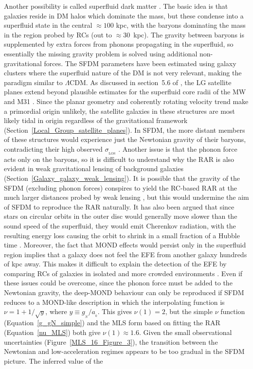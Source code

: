 \documentclass[fleqn,usenatbib,useAMS]{mnras} %
\begin{document}
Another possibility is called superfluid dark matter \citep[SFDM;][]{Berezhiani_2015, Berezhiani_2016}. The basic idea is that galaxies reside in DM halos which dominate the mass, but these condense into a superfluid state in the central $\approx 100$ kpc, with the baryons dominating the mass in the region probed by RCs (out to $\approx 30$~kpc). The gravity between baryons is supplemented by extra forces from phonons propagating in the superfluid, so essentially the missing gravity problem is solved using additional non-gravitational forces. The SFDM parameters have been estimated using galaxy clusters \citep{Hodson_2017_SFDM_clusters} where the superfluid nature of the DM is not very relevant, making the paradigm similar to $\Lambda$CDM. As discussed in section~5.6 of \citet{Roshan_2021_disc_stability}, the LG satellite planes extend beyond plausible estimates for the superfluid core radii of the MW and M31 \citep{Berezhiani_2016, Hossenfelder_2020}. Since the planar geometry and coherently rotating velocity trend make a primordial origin unlikely, the satellite galaxies in these structures are most likely tidal in origin regardless of the gravitational framework (Section~\ref{Local_Group_satellite_planes}). In SFDM, the more distant members of these structures would experience just the Newtonian gravity of their baryons, contradicting their high observed $\sigma_{_\text{LOS}}$ \citep{McGaugh_Wolf_2010, McGaugh_2013a, McGaugh_2013b}. Another issue is that the phonon force acts only on the baryons, so it is difficult to understand why the RAR is also evident in weak gravitational lensing of background galaxies (Section~\ref{Galaxy_galaxy_weak_lensing}). It is possible that the gravity of the SFDM (excluding phonon forces) conspires to yield the RC-based RAR at the much larger distances probed by weak lensing \citep{Brimioulle_2013, Milgrom_2013, Brouwer_2017, Brouwer_2021}, but this would undermine the aim of SFDM to reproduce the RAR naturally. It has also been argued that since stars on circular orbits in the outer disc would generally move slower than the sound speed of the superfluid, they would emit Cherenkov radiation, with the resulting energy loss causing the orbit to shrink in a small fraction of a Hubble time \citep{Mistele_2021}. Moreover, the fact that MOND effects would persist only in the superfluid region implies that a galaxy does not feel the EFE from another galaxy hundreds of kpc away. This makes it difficult to explain the detection of the EFE by comparing RCs of galaxies in isolated and more crowded environments \citep{Chae_2020_EFE, Chae_2021}. Even if these issues could be overcome, since the phonon force must be added to the Newtonian gravity, the deep-MOND behaviour can only be reproduced if SFDM reduces to a MOND-like description in which the interpolating function is $\nu = 1 + 1/\sqrt{y}$, where $y \equiv g_{_N}/a_{_0}$. This gives $\nu \left( 1 \right) = 2$, but the simple $\nu$ function (Equation~\ref{g_gN_simple}) and the MLS form based on fitting the RAR (Equation~\ref{nu_MLS}) both give $\nu \left( 1 \right) \approx 1.6$. Given the small observational uncertainties (Figure~\ref{MLS_16_Figure_3}), the transition between the Newtonian and low-acceleration regimes appears to be too gradual in the SFDM picture. The inferred value of the 
\end{document}
